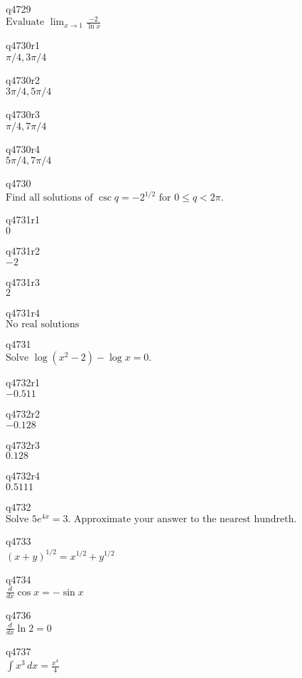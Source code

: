q4729\\
\(\displaystyle \text{Evaluate } \lim_{x \rightarrow 1} \frac{-2}{\ln x} \)

q4730r1\\
\(\displaystyle \pi/4, 3\pi/4 \)

q4730r2\\
\(\displaystyle 3\pi/4, 5\pi/4 \)

q4730r3\\
\(\displaystyle \pi/4, 7\pi/4 \)

q4730r4\\
\(\displaystyle 5\pi/4, 7\pi/4 \)

q4730\\
\(\displaystyle \text{Find all solutions of } \csc q = -2^{1/2} \text{ for } 0 \leq q < 2\pi. \)

q4731r1\\
\(\displaystyle 0 \)

q4731r2\\
\(\displaystyle -2 \)

q4731r3\\
\(\displaystyle 2 \)

q4731r4\\
\(\displaystyle \text{No real solutions} \)

q4731\\
\(\displaystyle \text{Solve } \log(x^2 - 2) - \log x = 0. \)

q4732r1\\
\(\displaystyle -0.511 \)

q4732r2\\
\(\displaystyle -0.128 \)

q4732r3\\
\(\displaystyle 0.128 \)

q4732r4\\
\(\displaystyle 0.5111 \)

q4732\\
\(\displaystyle \text{Solve } 5e^{4x} = 3. \text{ Approximate your answer to the nearest hundreth.} \)

q4733\\
\(\displaystyle (x+y)^{1/2} = x^{1/2} + y^{1/2} \)

q4734\\
\(\displaystyle \frac{d}{dx} \cos x = -\sin x \)

q4736\\
\(\displaystyle \frac{d}{dx} \ln 2 = 0 \)

q4737\\
\(\displaystyle \int x^3\,dx = \frac{x^4}{4} \)

